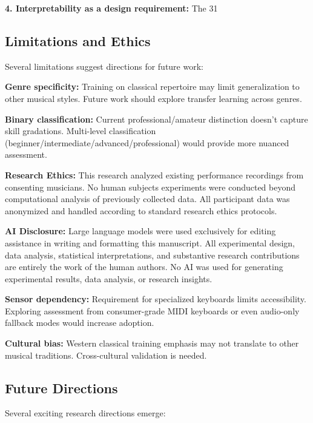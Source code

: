 \documentclass[sigconf,review,anonymous]{acmart}
\begin{document}
\textbf{4. Interpretability as a design requirement:} The 31%

\subsection{Limitations and Ethics}

Several limitations suggest directions for future work:

\textbf{Genre specificity:} Training on classical repertoire may limit generalization to other musical styles. Future work should explore transfer learning across genres.

\textbf{Binary classification:} Current professional/amateur distinction doesn't capture skill gradations. Multi-level classification (beginner/intermediate/advanced/professional) would provide more nuanced assessment.

\textbf{Research Ethics:} This research analyzed existing performance recordings from consenting musicians. No human subjects experiments were conducted beyond computational analysis of previously collected data. All participant data was anonymized and handled according to standard research ethics protocols.

\textbf{AI Disclosure:} Large language models were used exclusively for editing assistance in writing and formatting this manuscript. All experimental design, data analysis, statistical interpretations, and substantive research contributions are entirely the work of the human authors. No AI was used for generating experimental results, data analysis, or research insights.

\textbf{Sensor dependency:} Requirement for specialized keyboards limits accessibility. Exploring assessment from consumer-grade MIDI keyboards or even audio-only fallback modes would increase adoption.

\textbf{Cultural bias:} Western classical training emphasis may not translate to other musical traditions. Cross-cultural validation is needed.

\subsection{Future Directions}

Several exciting research directions emerge:
\end{document}
